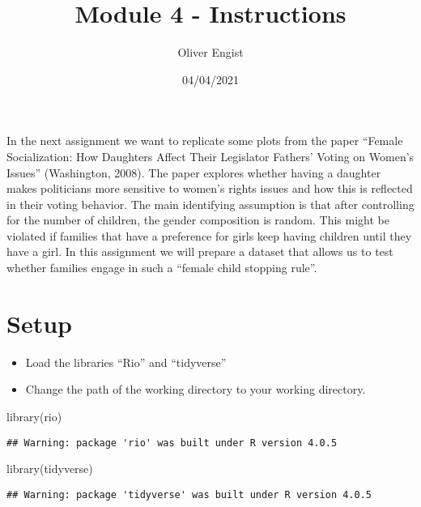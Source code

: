 \documentclass[
]{article}
\title{Module 4 - Instructions}
\author{Oliver Engist}
\date{04/04/2021}
\newenvironment{Shaded}{\begin{snugshade}}{\end{snugshade}}
\newcommand{\FunctionTok}[1]{\textcolor[rgb]{0.00,0.00,0.00}{#1}}
\newcommand{\NormalTok}[1]{#1}
\providecommand{\tightlist}{%
  \setlength{\itemsep}{0pt}\setlength{\parskip}{0pt}}
\begin{document}
\maketitle

In the next assignment we want to replicate some plots from the paper
``Female Socialization: How Daughters Affect Their Legislator Fathers'
Voting on Women's Issues'' (Washington, 2008). The paper explores
whether having a daughter makes politicians more sensitive to women's
rights issues and how this is reflected in their voting behavior. The
main identifying assumption is that after controlling for the number of
children, the gender composition is random. This might be violated if
families that have a preference for girls keep having children until
they have a girl. In this assignment we will prepare a dataset that
allows us to test whether families engage in such a ``female child
stopping rule''.

\hypertarget{setup}{%
\section{Setup}\label{setup}}

\begin{itemize}
\tightlist
\item
  Load the libraries ``Rio'' and ``tidyverse''
\item
  Change the path of the working directory to your working directory.
\end{itemize}

\begin{Shaded}
\begin{Highlighting}[]
\FunctionTok{library}\NormalTok{(rio)}
\end{Highlighting}
\end{Shaded}

\begin{verbatim}
## Warning: package 'rio' was built under R version 4.0.5
\end{verbatim}

\begin{Shaded}
\begin{Highlighting}[]
\FunctionTok{library}\NormalTok{(tidyverse)}
\end{Highlighting}
\end{Shaded}

\begin{verbatim}
## Warning: package 'tidyverse' was built under R version 4.0.5
\end{verbatim}
\end{document}
